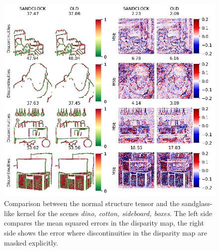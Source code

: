\documentclass  [
  paper    = a4,
  BCOR     = 10mm,
  twoside,
  fontsize = 12pt,
  fleqn,
  toc      = bibnumbered,
  toc      = listofnumbered,
  numbers  = noendperiod,
  headings = normal,
  listof   = leveldown,
  version  = 3.03
]                                       {scrreprt}
\begin{document}
\begin{figure}
	\centering
	\includegraphics[width=1\linewidth]{images/sandclock_results}
	\caption[Results with custom sized kernel]{Comparison between the normal structure tensor and the sandglass- like kernel for the scenes \textit{dino, cotton, sideboard, boxes}. The left side compares the mean squared errors in the disparity map, the right side shows the error where discontinuities in the disparity map are masked explicitly.}
	\label{fig:sandclockresults}
\end{figure}
\end{document}
